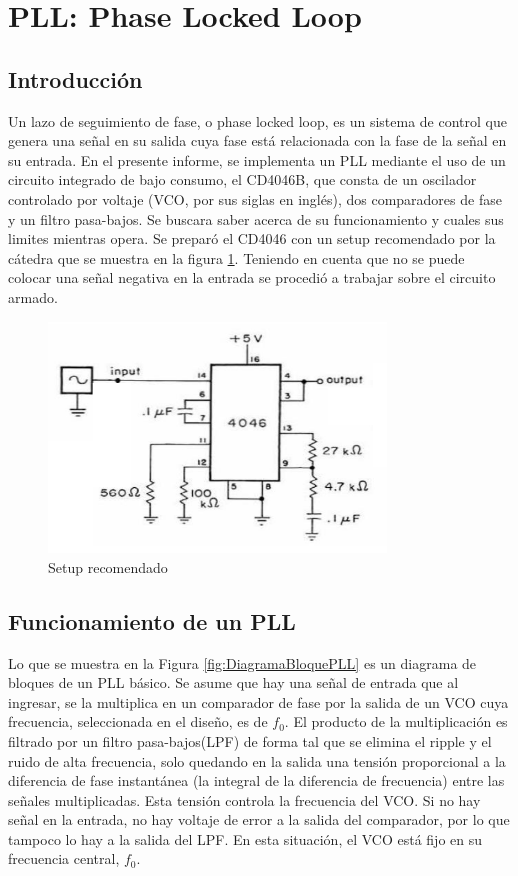\section{PLL: Phase Locked Loop}

\subsection{Introducción}

Un lazo de seguimiento de fase, o phase locked loop, es un sistema de control que genera una señal en su salida cuya fase está relacionada con la fase de la señal en su entrada. En el presente informe, se implementa un PLL mediante el uso de un circuito integrado de bajo consumo, el CD4046B, que consta de un oscilador controlado por voltaje (VCO, por sus siglas en inglés), dos comparadores de fase y un filtro pasa-bajos. Se buscara saber acerca de su funcionamiento y cuales sus limites mientras opera. 
Se preparó el CD4046 con un setup recomendado por la cátedra que se muestra en la figura \ref{fig:Circuito PLL}. Teniendo en cuenta que no se puede colocar una señal negativa en la entrada se procedió a trabajar sobre el circuito armado.

\begin{figure}[H]
	\centering
	\includegraphics[width= 0.8\textwidth]{../1. PLL/Imagenes/Circuito PLL.png} 
	\caption{Setup recomendado}
	\label{fig:Circuito PLL}
\end{figure}

\subsection{Funcionamiento de un PLL}

Lo que se muestra en la Figura \ref{fig:DiagramaBloquePLL} es un diagrama de bloques de un PLL básico. Se asume que hay una señal de entrada que al ingresar, se la multiplica en un comparador de fase por la salida de un VCO cuya frecuencia, seleccionada en el diseño, es de $f_0$. El producto de la multiplicación es filtrado por un filtro pasa-bajos(LPF) de forma tal que se elimina el ripple y el ruido de alta frecuencia, solo quedando en la salida una tensión proporcional a la diferencia de fase instantánea (la integral de la diferencia de frecuencia) entre las señales multiplicadas. Esta tensión controla la frecuencia del VCO. Si no hay señal en la entrada, no hay voltaje de error a la salida del comparador, por lo que tampoco lo hay a la salida del LPF. En esta situación, el VCO está fijo en su frecuencia central, $f_0$.


